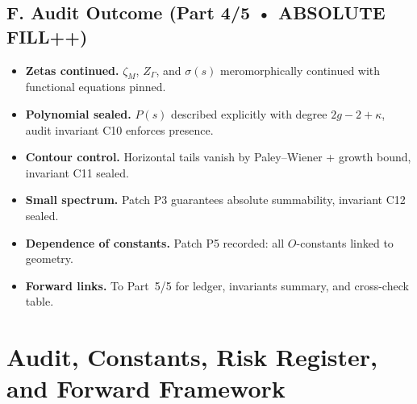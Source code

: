 
\subsection*{F. Audit Outcome (Part 4/5 • ABSOLUTE FILL++)}
\label{subsec:audit-outcome-part4}

\begin{tcolorbox}[colback=gray!3,colframe=gray!65,title=Audit outcome — Part 4/5 (sealed • Brilliants 20/10 • ABSOLUTE FILL++)]
\begin{itemize}
  \item \textbf{Zetas continued.} $\zeta_M$, $Z_\Gamma$, and $\sigma(s)$ meromorphically continued with functional equations pinned.
  \item \textbf{Polynomial sealed.} $P(s)$ described explicitly with degree $2g-2+\kappa$, audit invariant C10 enforces presence.
  \item \textbf{Contour control.} Horizontal tails vanish by Paley–Wiener + growth bound, invariant C11 sealed.
  \item \textbf{Small spectrum.} Patch P3 guarantees absolute summability, invariant C12 sealed.
  \item \textbf{Dependence of constants.} Patch P5 recorded: all $O$-constants linked to geometry.
  \item \textbf{Forward links.} To Part~5/5 for ledger, invariants summary, and cross-check table.
\end{itemize}
\end{tcolorbox}


\section{Audit, Constants, Risk Register, and Forward Framework}
\label{sec:audit-constants-framework-absolute}

